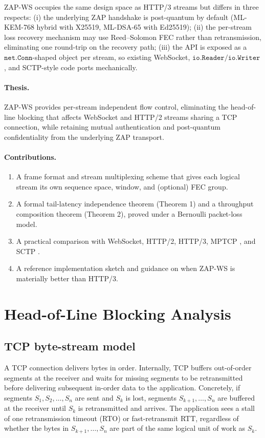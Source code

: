 \documentclass[11pt,a4paper]{article}
\begin{document}
ZAP-WS occupies the same design space as HTTP/3 streams but differs in
three respects: (i) the underlying ZAP handshake is post-quantum by
default (ML-KEM-768 hybrid with X25519, ML-DSA-65 with Ed25519); (ii) the
per-stream loss recovery mechanism may use Reed--Solomon FEC rather than
retransmission, eliminating one round-trip on the recovery path;
(iii) the API is exposed as a $\texttt{net.Conn}$-shaped object per
stream, so existing WebSocket, $\texttt{io.Reader}/\texttt{io.Writer}$,
and SCTP-style code ports mechanically.

\paragraph{Thesis.} ZAP-WS provides per-stream independent flow control,
eliminating the head-of-line blocking that affects WebSocket and HTTP/2
streams sharing a TCP connection, while retaining mutual authentication
and post-quantum confidentiality from the underlying ZAP transport.

\paragraph{Contributions.}
\begin{enumerate}
\item A frame format and stream multiplexing scheme that gives each
logical stream its own sequence space, window, and (optional) FEC group.
\item A formal tail-latency independence theorem (Theorem 1) and a
throughput composition theorem (Theorem 2), proved under a Bernoulli
packet-loss model.
\item A practical comparison with WebSocket, HTTP/2, HTTP/3, MPTCP
\cite{rfc8684}, and SCTP \cite{rfc4960}.
\item A reference implementation sketch and guidance on when ZAP-WS is
materially better than HTTP/3.
\end{enumerate}

\section{Head-of-Line Blocking Analysis}
\label{sec:hol}

\subsection{TCP byte-stream model}

A TCP connection delivers bytes in order. Internally, TCP buffers
out-of-order segments at the receiver and waits for missing segments to
be retransmitted before delivering subsequent in-order data to the
application. Concretely, if segments
$S_1, S_2, \ldots, S_n$ are sent and $S_k$ is lost, segments
$S_{k+1}, \ldots, S_n$ are buffered at the receiver until $S_k$ is
retransmitted and arrives. The application sees a stall of one
retransmission timeout (RTO) or fast-retransmit RTT, regardless of
whether the bytes in $S_{k+1}, \ldots, S_n$ are part of the same logical
unit of work as $S_k$.
\end{document}
